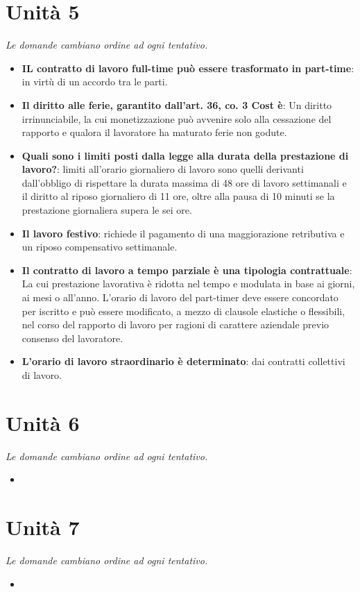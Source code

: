 \documentclass[12pt, a4paper]{report}
\begin{document}
\chapter{Unità 5}
    \textit{Le domande cambiano ordine ad ogni tentativo.}
    \begin{itemize}
        \item \textbf{IL contratto di lavoro full-time può essere trasformato in part-time}: in virtù di un accordo tra le parti.
        \item \textbf{Il diritto alle ferie, garantito dall’art. 36, co. 3 Cost è}: Un diritto irrinunciabile, la cui monetizzazione può avvenire solo alla cessazione del rapporto e qualora il lavoratore ha maturato ferie non godute.
        \item \textbf{Quali sono i limiti posti dalla legge alla durata della prestazione di lavoro?}: limiti all’orario giornaliero di lavoro sono quelli derivanti dall’obbligo di rispettare la durata massima di 48 ore di lavoro settimanali e il diritto al riposo giornaliero di 11 ore, oltre alla pausa di 10 minuti se la prestazione giornaliera supera le sei ore.
        \item \textbf{Il lavoro festivo}: richiede il pagamento di una maggiorazione retributiva e un riposo compensativo settimanale.
        \item \textbf{Il contratto di lavoro a tempo parziale è una tipologia contrattuale}: La cui prestazione lavorativa è ridotta nel tempo e modulata in base ai giorni, ai mesi o all’anno. L’orario di lavoro del part-timer deve essere concordato per iscritto e può essere modificato, a mezzo di clausole elastiche o flessibili, nel corso del rapporto di lavoro per ragioni di carattere aziendale previo consenso del lavoratore.
        \item \textbf{L’orario di lavoro straordinario è determinato}: dai contratti collettivi di lavoro.
    \end{itemize}
\chapter{Unità 6}
    \textit{Le domande cambiano ordine ad ogni tentativo.}
    \begin{itemize}
        \item 
    \end{itemize}
\chapter{Unità 7}
    \textit{Le domande cambiano ordine ad ogni tentativo.}
    \begin{itemize}
        \item 
    \end{itemize}
\end{document}
